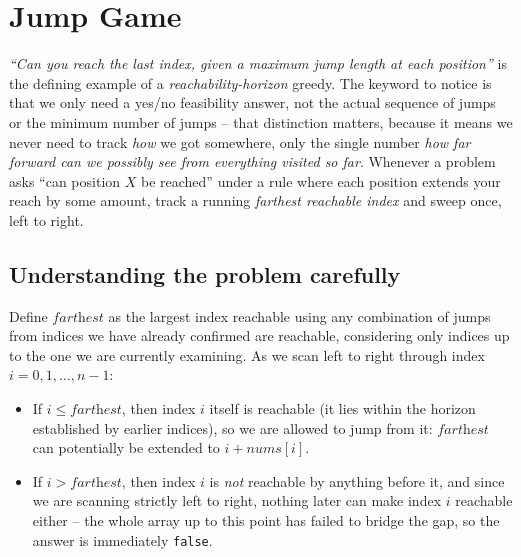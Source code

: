 \section{Jump Game}
\label{sec:jump-game}


\begin{patternbox}
\emph{``Can you reach the last index, given a maximum jump length at each
position''} is the defining example of a \emph{reachability-horizon}
greedy. The keyword to notice is that we only need a yes/no feasibility
answer, not the actual sequence of jumps or the minimum number of jumps --
that distinction matters, because it means we never need to track \emph{how}
we got somewhere, only the single number \emph{how far forward can we
possibly see from everything visited so far}. Whenever a problem asks
``can position $X$ be reached'' under a rule where each position extends
your reach by some amount, track a running \emph{farthest reachable index}
and sweep once, left to right.
\end{patternbox}

\subsection*{Understanding the problem carefully}

Define $\textit{farthest}$ as the largest index reachable using any
combination of jumps from indices we have already confirmed are reachable,
considering only indices up to the one we are currently examining. As we
scan left to right through index $i = 0, 1, \dots, n-1$:

\begin{itemize}
  \item If $i \le \textit{farthest}$, then index $i$ itself is reachable
        (it lies within the horizon established by earlier indices), so we
        are allowed to jump from it: $\textit{farthest}$ can potentially be
        extended to $i + \textit{nums}[i]$.
  \item If $i > \textit{farthest}$, then index $i$ is \emph{not} reachable
        by anything before it, and since we are scanning strictly left to
        right, nothing later can make index $i$ reachable either -- the
        whole array up to this point has failed to bridge the gap, so the
        answer is immediately \texttt{false}.
\end{itemize}

